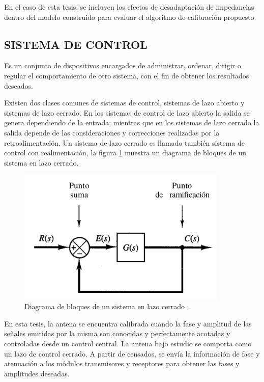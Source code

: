 En el caso de esta tesis, se incluyen los efectos de desadaptación de impedancias dentro del modelo construido para evaluar el
algoritmo de calibración propuesto.


\subsection{SISTEMA DE CONTROL}

Es un conjunto de dispositivos encargados de administrar, ordenar, dirigir o regular el comportamiento de otro sistema, con el
fin de obtener los resultados deseados.

Existen dos clases comunes de sistemas de control, sistemas de lazo abierto y sistemas de lazo cerrado. En los sistemas de
control de lazo abierto la salida se genera dependiendo de la entrada; mientras que en los sistemas de lazo cerrado la salida
depende de las consideraciones y correcciones realizadas por la retroalimentación. Un sistema de lazo cerrado es llamado
también sistema de control con realimentación, la figura \ref{fig:closedLoop} muestra un diagrama de bloques de un sistema en
lazo cerrado.

\begin{figure}[H]
 \centering
 \includegraphics[width=10cm]{gfx/closedLoop.png}
 \caption{Diagrama de bloques de un sistema en lazo cerrado \cite{Tobergte2013}.}
 \label{fig:closedLoop}
\end{figure}

En esta tesis, la antena se encuentra calibrada cuando la fase y amplitud de las señales emitidas por la misma son conocidas y
perfectamente acotadas y controladas desde un control central. La antena bajo estudio se comporta como un lazo de control
cerrado. A partir de censados, se envía la información de fase y atenuación a los módulos transmisores y receptores para obtener
las fases y amplitudes deseadas.


